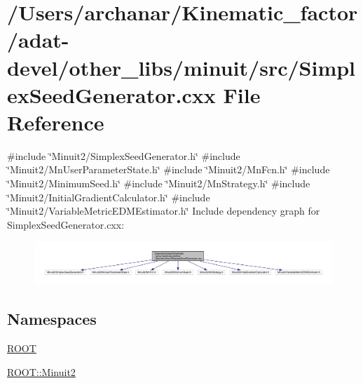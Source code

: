\hypertarget{adat-devel_2other__libs_2minuit_2src_2SimplexSeedGenerator_8cxx}{}\section{/\+Users/archanar/\+Kinematic\+\_\+factor/adat-\/devel/other\+\_\+libs/minuit/src/\+Simplex\+Seed\+Generator.cxx File Reference}
\label{adat-devel_2other__libs_2minuit_2src_2SimplexSeedGenerator_8cxx}
{\ttfamily \#include \char`\"{}Minuit2/\+Simplex\+Seed\+Generator.\+h\char`\"{}}\newline
{\ttfamily \#include \char`\"{}Minuit2/\+Mn\+User\+Parameter\+State.\+h\char`\"{}}\newline
{\ttfamily \#include \char`\"{}Minuit2/\+Mn\+Fcn.\+h\char`\"{}}\newline
{\ttfamily \#include \char`\"{}Minuit2/\+Minimum\+Seed.\+h\char`\"{}}\newline
{\ttfamily \#include \char`\"{}Minuit2/\+Mn\+Strategy.\+h\char`\"{}}\newline
{\ttfamily \#include \char`\"{}Minuit2/\+Initial\+Gradient\+Calculator.\+h\char`\"{}}\newline
{\ttfamily \#include \char`\"{}Minuit2/\+Variable\+Metric\+E\+D\+M\+Estimator.\+h\char`\"{}}\newline
Include dependency graph for Simplex\+Seed\+Generator.\+cxx\+:
\nopagebreak
\begin{figure}[H]
\begin{center}
\leavevmode
\includegraphics[width=350pt]{dc/dcf/adat-devel_2other__libs_2minuit_2src_2SimplexSeedGenerator_8cxx__incl}
\end{center}
\end{figure}
\subsection*{Namespaces}
\begin{DoxyCompactItemize}
\item 
 \mbox{\hyperlink{namespaceROOT}{R\+O\+OT}}
\item 
 \mbox{\hyperlink{namespaceROOT_1_1Minuit2}{R\+O\+O\+T\+::\+Minuit2}}
\end{DoxyCompactItemize}
